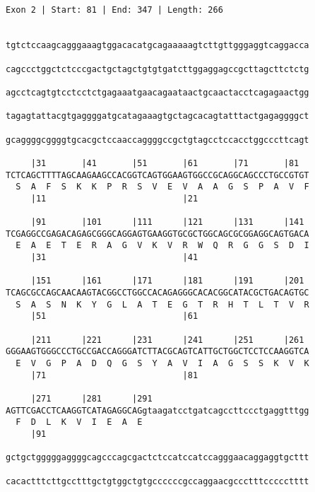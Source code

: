 \documentclass{article}
\begin{document}
\begin{Verbatim}
                    
 
Exon 2 | Start: 81 | End: 347 | Length: 266


tgtctccaagcagggaaagtggacacatgcagaaaaagtcttgttgggaggtcaggacca
                                                            
cagccctggctctcccgactgctagctgtgtgatcttggaggagccgcttagcttctctg
                                                            
agcctcagtgtcctcctctgagaaatgaacagaataactgcaactacctcagagaactgg
                                                            
tagagtattacgtgaggggatgcatagaaagtgctagcacagtatttactgagaggggct
                                                            
gcaggggcggggtgcacgctccaaccaggggccgctgtagcctccacctggcccttcagt
                                                            
     |31       |41       |51       |61       |71       |81  
TCTCAGCTTTTAGCAAGAAGCCACGGTCAGTGGAAGTGGCCGCAGGCAGCCCTGCCGTGT
  S  A  F  S  K  K  P  R  S  V  E  V  A  A  G  S  P  A  V  F
     |11                           |21                      
  
     |91       |101      |111      |121      |131      |141 
TCGAGGCCGAGACAGAGCGGGCAGGAGTGAAGGTGCGCTGGCAGCGCGGAGGCAGTGACA
  E  A  E  T  E  R  A  G  V  K  V  R  W  Q  R  G  G  S  D  I
     |31                           |41                      
  
     |151      |161      |171      |181      |191      |201 
TCAGCGCCAGCAACAAGTACGGCCTGGCCACAGAGGGCACACGGCATACGCTGACAGTGC
  S  A  S  N  K  Y  G  L  A  T  E  G  T  R  H  T  L  T  V  R
     |51                           |61                      
  
     |211      |221      |231      |241      |251      |261 
GGGAAGTGGGCCCTGCCGACCAGGGATCTTACGCAGTCATTGCTGGCTCCTCCAAGGTCA
  E  V  G  P  A  D  Q  G  S  Y  A  V  I  A  G  S  S  K  V  K
     |71                           |81                      
  
     |271      |281      |291                               
AGTTCGACCTCAAGGTCATAGAGGCAGgtaagatcctgatcagccttccctgaggtttgg
  F  D  L  K  V  I  E  A  E                                 
     |91                                                    
  
gctgctgggggaggggcagcccagcgactctccatccatccagggaacaggaggtgcttt
                                                            
cacactttcttgcctttgctgtggctgtgccccccgccaggaacgccctttccccctttt
                                                            

\end{Verbatim}
\end{document}
